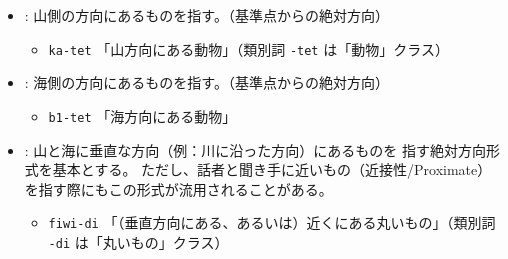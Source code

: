 \begin{itemize}
    \item \textbf{}: {山側}の方向にあるものを指す。（基準点からの絶対方向）
        \begin{itemize}
            \item \texttt{ka-tet}
            \quad 「山方向にある動物」（類別詞 \texttt{-tet} は「動物」クラス）
        \end{itemize}
    \item \textbf{}: {海側}の方向にあるものを指す。（基準点からの絶対方向）
        \begin{itemize}
            \item \texttt{b1-tet}
            \quad 「海方向にある動物」
        \end{itemize}
    \item \textbf{}: 山と海に{垂直な方向}（例：川に沿った方向）にあるものを
    指す{絶対方向形式}を基本とする。
    ただし、話者と聞き手に近いもの（近接性/Proximate）を指す際にもこの形式が流用されることがある。
        \begin{itemize}
            \item \texttt{fiwi-di}
            \quad 「（垂直方向にある、あるいは）近くにある丸いもの」（類別詞 \texttt{-di} は「丸いもの」クラス）
        \end{itemize}
\end{itemize}

